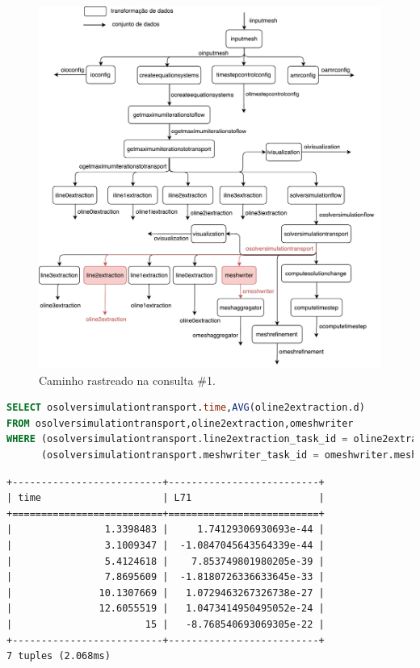 \begin{figure}[!htb]
    \centering
    \includegraphics[width=\textwidth]{img/experiments-dataflow-1}
    \caption[Caminho rastreado na consulta \#1]{Caminho rastreado na consulta \#1.}%
    \label{fig:experiments-dataflow-1}
\end{figure}

\begin{minipage}[c]{0.95\textwidth}
\begin{lstlisting}[language=sql,label={lst:experiments-1-sql},caption={[Código SQL gerado na consulta~\#1]Código SQL gerado na consulta~\#1.}]
SELECT osolversimulationtransport.time,AVG(oline2extraction.d)
FROM osolversimulationtransport,oline2extraction,omeshwriter
WHERE (osolversimulationtransport.line2extraction_task_id = oline2extraction.line2extraction_task_id) and
      (osolversimulationtransport.meshwriter_task_id = omeshwriter.meshwriter_task_id);
\end{lstlisting}
\end{minipage}

\begin{verbatim}
+--------------------------+--------------------------+
| time                     | L71                      |
+==========================+==========================+
|                1.3398483 |     1.74129306930693e-44 |
|                3.1009347 |  -1.0847045643564339e-44 |
|                5.4124618 |    7.853749801980205e-39 |
|                7.8695609 |  -1.8180726336633645e-33 |
|               10.1307669 |   1.0729463267326738e-27 |
|               12.6055519 |   1.0473414950495052e-24 |
|                       15 |   -8.768540693069305e-22 |
+--------------------------+--------------------------+
7 tuples (2.068ms)
\end{verbatim}

